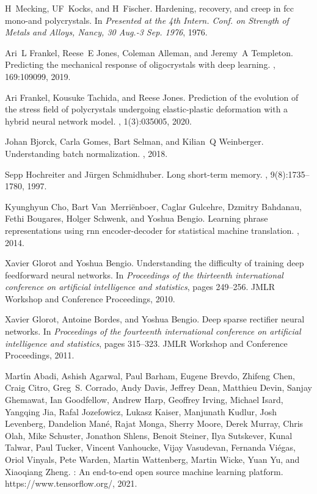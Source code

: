 \documentclass[12pt,reqno]{article}
\begin{document}
\begin{thebibliography}{10}
H~Mecking, UF~Kocks, and H~Fischer.
\newblock Hardening, recovery, and creep in fcc mono-and polycrystals.
\newblock In {\em Presented at the 4th Intern. Conf. on Strength of Metals and
Alloys, Nancy, 30 Aug.-3 Sep. 1976}, 1976.

Ari~L Frankel, Reese~E Jones, Coleman Alleman, and Jeremy~A Templeton.
\newblock Predicting the mechanical response of oligocrystals with deep
learning.
, 169:109099, 2019.

Ari Frankel, Kousuke Tachida, and Reese Jones.
\newblock Prediction of the evolution of the stress field of polycrystals
undergoing elastic-plastic deformation with a hybrid neural network model.
, 1(3):035005, 2020.

Johan Bjorck, Carla Gomes, Bart Selman, and Kilian~Q Weinberger.
\newblock Understanding batch normalization.
, 2018.

Sepp Hochreiter and J{\"u}rgen Schmidhuber.
\newblock Long short-term memory.
, 9(8):1735--1780, 1997.

Kyunghyun Cho, Bart Van~Merri{\"e}nboer, Caglar Gulcehre, Dzmitry Bahdanau,
Fethi Bougares, Holger Schwenk, and Yoshua Bengio.
\newblock Learning phrase representations using rnn encoder-decoder for
statistical machine translation.
, 2014.

Xavier Glorot and Yoshua Bengio.
\newblock Understanding the difficulty of training deep feedforward neural
networks.
\newblock In {\em Proceedings of the thirteenth international conference on
artificial intelligence and statistics}, pages 249--256. JMLR Workshop and
Conference Proceedings, 2010.

Xavier Glorot, Antoine Bordes, and Yoshua Bengio.
\newblock Deep sparse rectifier neural networks.
\newblock In {\em Proceedings of the fourteenth international conference on
artificial intelligence and statistics}, pages 315--323. JMLR Workshop and
Conference Proceedings, 2011.

Mart\'{\i}n Abadi, Ashish Agarwal, Paul Barham, Eugene Brevdo, Zhifeng Chen,
  Craig Citro, Greg~S. Corrado, Andy Davis, Jeffrey Dean, Matthieu Devin,
  Sanjay Ghemawat, Ian Goodfellow, Andrew Harp, Geoffrey Irving, Michael Isard,
  Yangqing Jia, Rafal Jozefowicz, Lukasz Kaiser, Manjunath Kudlur, Josh
  Levenberg, Dandelion Man\'{e}, Rajat Monga, Sherry Moore, Derek Murray, Chris
  Olah, Mike Schuster, Jonathon Shlens, Benoit Steiner, Ilya Sutskever, Kunal
  Talwar, Paul Tucker, Vincent Vanhoucke, Vijay Vasudevan, Fernanda Vi\'{e}gas,
  Oriol Vinyals, Pete Warden, Martin Wattenberg, Martin Wicke, Yuan Yu, and
  Xiaoqiang Zheng.
: An end-to-end open source machine learning platform.
\newblock https://www.tensorflow.org/, 2021.


\end{thebibliography}
\end{document}
